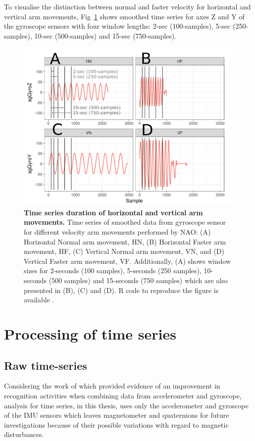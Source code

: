 To visualise the distinction between normal and faster velocity for horizontal 
and vertical arm movements, Fig~\ref{fig:sts} shows smoothed time series 
for axes Z and Y of the gyroscope sensors with four window lengths: 
2-sec (100-samples), 5-sec (250-samples), 10-sec (500-samples) 
and 15-sec (750-samples).
\begin{figure}[!h] 
  \centering
  \includegraphics[width=1.0\textwidth]{sts}
    \caption{
	{\bf Time series duration of horizontal and vertical arm movements.} 
		Time series of smoothed data from gyroscope sensor 
		for different velocity arm movements performed by NAO: 
		(A) Horizontal Normal arm movement, HN, 
		(B) Horizontal Faster arm movement, HF,
		(C) Vertical Normal arm movement, VN, and 
		(D) Vertical Faster arm movement, VF.
		Additionally, (A) shows window sizes for 2-seconds 
		(100 samples), 5-seconds (250 samples), 
		10-seconds (500 samples) and 15-seconds (750 samples)
		which are also presented in (B), (C) and (D).
		R code to reproduce the figure is available \cite{hwum2018}.
        }
	\label{fig:sts}
\end{figure}

\section{Processing of time series} \label{sec:preparation_timeseries}

\subsection{Raw time-series}
Considering the work of \cite{shoaib2016} which provided evidence 
of an improvement in recognition activities when combining data 
from accelerometer and gyroscope, analysis for time series, in this thesis, 
uses only the accelerometer and gyroscope of the IMU sensors which leaves 
magnetometer and quaternions for future investigations because of 
their possible variations with regard to magnetic disturbances.

